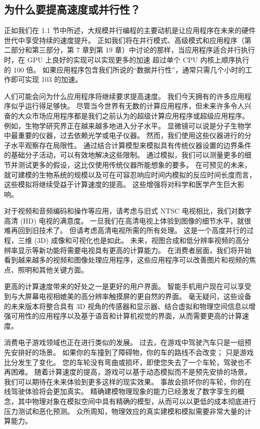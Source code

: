 \subsection{为什么要提高速度或并行性？}
正如我们在 1.1 节中所述，大规模并行编程的主要动机是让应用程序在未来的硬件世代中享受持续的速度提升。 正如我们将在并行模式、高级模式和应用程序（第二部分和第三部分，第 7 章到第 19 章）中讨论的那样，当应用程序适合并行执行时，在 GPU 上良好的实现可以实现更多的加速 超过单个 CPU 内核上顺序执行的 100 倍。 如果应用程序包含我们所说的“数据并行性”，通常只需几个小时的工作即可实现 103 的加速。

人们可能会问为什么应用程序将继续要求提高速度。 我们今天拥有的许多应用程序似乎运行得足够快。 尽管当今世界有无数的计算应用程序，但未来许多令人兴奋的大众市场应用程序都是我们之前认为的超级计算应用程序或超级应用程序。 例如，生物学研究界正在越来越多地进入分子水平。 显微镜可以说是分子生物学中最重要的仪器，过去依赖光学或电子仪器。 然而，我们使用这些仪器进行的分子水平观察存在局限性。 通过结合计算模型来模拟具有传统仪器设置的边界条件的基础分子活动，可以有效地解决这些限制。 通过模拟，我们可以测量更多的细节并测试更多的假设，这比仅使用传统仪器所能想象的要多。 在可预见的未来，就可建模的生物系统的规模以及可在可容忍响应时间内模拟的反应时间长度而言，这些模拟将继续受益于计算速度的提高。 这些增强将对科学和医学产生巨大影响。

对于视频和音频编码和操作等应用，请考虑与旧式 NTSC 电视相比，我们对数字高清 (HD) 电视的满意度。 一旦我们在高清电视上体验到图像的细节水平，就很难再回到旧技术了。 但请考虑高清电视所需的所有处理。 这是一个高度并行的过程，三维 (3D) 成像和可视化也是如此。 未来，视图合成和低分辨率视频的高分辨率显示等新功能将需要电视具有更高的计算能力。 在消费者层面，我们将开始看到越来越多的视频和图像处理应用程序，这些应用程序可以改善图片和视频的焦点、照明和其他关键方面。

更高的计算速度带来的好处之一是更好的用户界面。 智能手机用户现在可以享受到与大屏幕电视相媲美的高分辨率触摸屏的更自然的界面。 毫无疑问，这些设备的未来版本将整合具有 3D 视角的传感器和显示器、结合虚拟和物理空间信息以增强可用性的应用程序以及基于语音和计算机视觉的界面，从而需要更高的计算速度。

消费电子游戏领域也正在进行类似的发展。 过去，在游戏中驾驶汽车只是一组预先安排好的场景。 如果你的车撞到了障碍物，你的车的路线不会改变； 只是游戏比分发生了变化。 您的车轮没有弯曲或损坏，即使您失去了一个车轮，驾驶也不再困难。 随着计算速度的提高，游戏可以基于动态模拟而不是预先安排的场景。 我们可以期待在未来体验到更多这样的现实效果。 事故会损坏你的车轮，你的在线驾驶体验将会更加真实。 精确建模物理现象的能力已经激发了数字孪生的概念，其中物理对象在模拟空间中具有精确的模型，从而可以以更低的成本彻底进行压力测试和恶化预测。 众所周知，物理效应的真实建模和模拟需要非常大量的计算能力。

